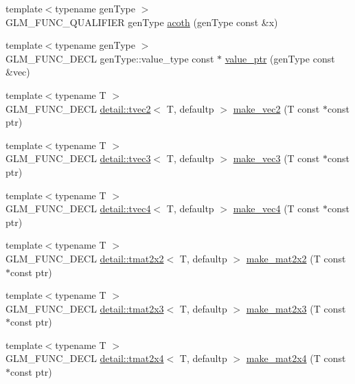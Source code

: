 \begin{DoxyCompactItemize}
\item 
{\footnotesize template$<$typename gen\+Type $>$ }\\G\+L\+M\+\_\+\+F\+U\+N\+C\+\_\+\+Q\+U\+A\+L\+I\+F\+I\+ER gen\+Type \hyperlink{group__gtc__reciprocal_gad73911994e6bb6a06cc3ea1bd89201ab}{acoth} (gen\+Type const \&x)
\item 
{\footnotesize template$<$typename gen\+Type $>$ }\\G\+L\+M\+\_\+\+F\+U\+N\+C\+\_\+\+D\+E\+CL gen\+Type\+::value\+\_\+type const $\ast$ \hyperlink{group__gtc__type__ptr_gaf019636bb8bd7c9efb7c7ce3bb23bcfc}{value\+\_\+ptr} (gen\+Type const \&vec)
\item 
{\footnotesize template$<$typename T $>$ }\\G\+L\+M\+\_\+\+F\+U\+N\+C\+\_\+\+D\+E\+CL \hyperlink{structglm_1_1detail_1_1tvec2}{detail\+::tvec2}$<$ T, defaultp $>$ \hyperlink{group__gtc__type__ptr_ga70f570befb4773ba3a658b76f9fdd6ab}{make\+\_\+vec2} (T const $\ast$const ptr)
\item 
{\footnotesize template$<$typename T $>$ }\\G\+L\+M\+\_\+\+F\+U\+N\+C\+\_\+\+D\+E\+CL \hyperlink{structglm_1_1detail_1_1tvec3}{detail\+::tvec3}$<$ T, defaultp $>$ \hyperlink{group__gtc__type__ptr_gad91a6a0fe324630b151208703a1591ed}{make\+\_\+vec3} (T const $\ast$const ptr)
\item 
{\footnotesize template$<$typename T $>$ }\\G\+L\+M\+\_\+\+F\+U\+N\+C\+\_\+\+D\+E\+CL \hyperlink{structglm_1_1detail_1_1tvec4}{detail\+::tvec4}$<$ T, defaultp $>$ \hyperlink{group__gtc__type__ptr_ga1b9e0d9ca48d79ba87edc121c1872c44}{make\+\_\+vec4} (T const $\ast$const ptr)
\item 
{\footnotesize template$<$typename T $>$ }\\G\+L\+M\+\_\+\+F\+U\+N\+C\+\_\+\+D\+E\+CL \hyperlink{structglm_1_1detail_1_1tmat2x2}{detail\+::tmat2x2}$<$ T, defaultp $>$ \hyperlink{group__gtc__type__ptr_ga860d529f631ea6f9a0e510491d29a8ac}{make\+\_\+mat2x2} (T const $\ast$const ptr)
\item 
{\footnotesize template$<$typename T $>$ }\\G\+L\+M\+\_\+\+F\+U\+N\+C\+\_\+\+D\+E\+CL \hyperlink{structglm_1_1detail_1_1tmat2x3}{detail\+::tmat2x3}$<$ T, defaultp $>$ \hyperlink{group__gtc__type__ptr_gadef48cd950566f23a4b1e47127ee478c}{make\+\_\+mat2x3} (T const $\ast$const ptr)
\item 
{\footnotesize template$<$typename T $>$ }\\G\+L\+M\+\_\+\+F\+U\+N\+C\+\_\+\+D\+E\+CL \hyperlink{structglm_1_1detail_1_1tmat2x4}{detail\+::tmat2x4}$<$ T, defaultp $>$ \hyperlink{group__gtc__type__ptr_ga174a43e8913682834de9cd918e36df25}{make\+\_\+mat2x4} (T const $\ast$const ptr)

\end{DoxyCompactItemize}
